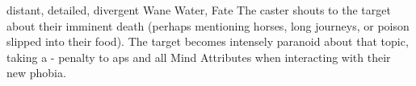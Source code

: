   {distant, detailed, divergent}%
  {Wane}%
  {Water, Fate}%
  {}%
  {The caster shouts to the target about their imminent death (perhaps mentioning horses, long journeys, or poison slipped into their food).
    The target becomes intensely paranoid about that topic, taking a - penalty to \glspl{ap} and all Mind Attributes when interacting with their new phobia.
  }%
  {}
